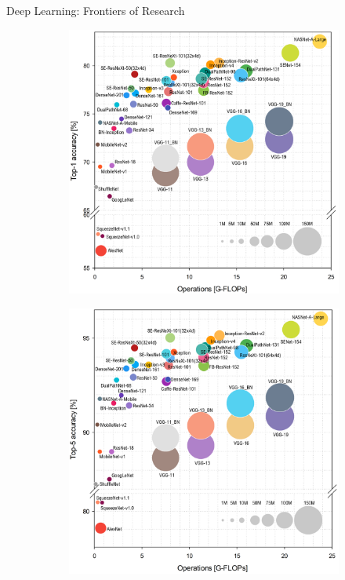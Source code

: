 \documentclass[notheorems]{beamer}
\begin{document}
    \begin{frame}{Deep Learning: Frontiers of Research}

        \begin{figure}
            \centering
            \begin{subfigure}[t]{0.45\textwidth}
                \includegraphics[width=\linewidth]{figures/FLOPS1}
            \end{subfigure}
            \begin{subfigure}[t]{0.45\textwidth}
                \includegraphics[width=\textwidth]{figures/FLOPS5}
            \end{subfigure}
        \end{figure}


\end{frame}
\end{document}
